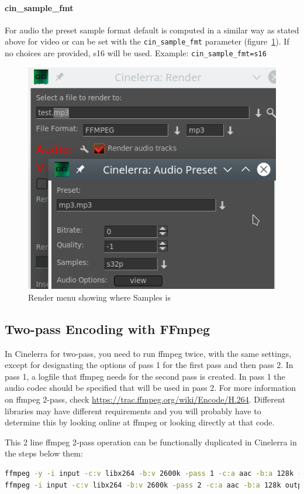 \paragraph{cin\_sample\_fmt} For audio the preset sample format default is computed in a similar way as stated above for video or can be set with the \texttt{cin\_sample\_fmt} parameter (figure~\ref{fig:audio}).  If no choices are provided, s16 will be used.
Example: \texttt{cin\_sample\_fmt=s16}

\begin{figure}[htpb]
    \centering
    \includegraphics[width=0.6\linewidth]{images/audio.png}
    \caption{Render menu showing where Samples is}
    \label{fig:audio}
\end{figure}

\subsection{Two-pass Encoding with FFmpeg}%
\label{sub:two_pass_encoding_ffmpeg}

In Cinelerra for two-pass, you need to run ffmpeg twice, with the same settings, except for designating the options of pass 1 for the first pass and then pass 2.  In pass 1, a logfile that ffmpeg needs for the second pass is created.  In pass 1 the audio codec should be specified that will be used in pass 2.  For more information on ffmpeg 2-pass, check \url{https://trac.ffmpeg.org/wiki/Encode/H.264}.  Different libraries may have different requirements and you will probably have to determine this by looking online at ffmpeg or looking directly at that code.

This 2 line ffmpeg 2-pass operation can be functionally duplicated in Cinelerra in the steps below them:

\begin{lstlisting}[language=bash]
ffmpeg -y -i input -c:v libx264 -b:v 2600k -pass 1 -c:a aac -b:a 128k -f mp4 /dev/null && \
ffmpeg -i input -c:v libx264 -b:v 2600k -pass 2 -c:a aac -b:a 128k output.mp4
\end{lstlisting}

